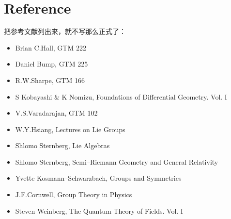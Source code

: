 \chapter*{Reference}
把参考文献列出来，就不写那么正式了：
\begin{itemize}

\item Brian C.Hall, GTM 222

\item Daniel Bump, GTM 225

\item R.W.Sharpe, GTM 166

\item S Kobayashi \& K Nomizu, Foundations of Differential Geometry. Vol. I

\item V.S.Varadarajan, GTM 102

\item W.Y.Hsiang, Lectures on Lie Groups

\item Shlomo Sternberg, Lie Algebras

\item Shlomo Sternberg, Semi--Riemann Geometry and General Relativity

\item Yvette Kosmann--Schwarzbach, Groups and Symmetries

\item J.F.Cornwell, Group Theory in Physics

\item Steven Weinberg, The Quantum Theory of Fields. Vol. I

\end{itemize}